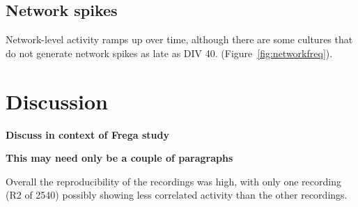 \documentclass[doublespacing]{bmcart}
\begin{document}
\subsection*{Network spikes}
Network-level activity ramps up over time, although there are some
cultures that do not generate network spikes as late as DIV 40.
(Figure~\ref{fig:networkfreq}).

\section*{Discussion}
\textbf{Discuss in context of Frega study}  \cite{Frega2019}

\textbf{This may need only be a couple of paragraphs}

Overall the reproducibility of the recordings was high, with only one recording (R2 of 2540) possibly showing less correlated activity than the other recordings.

\vspace*{1cm}
\end{document}
